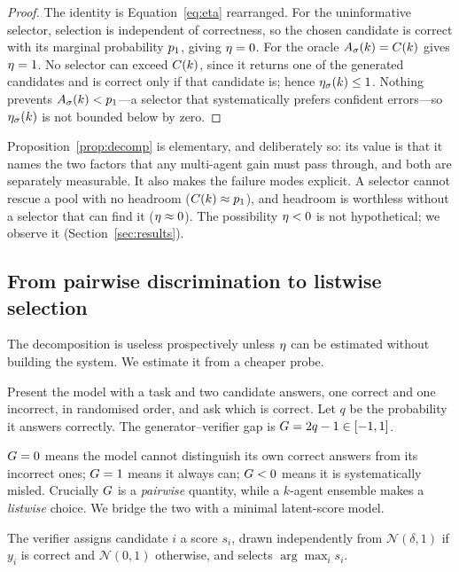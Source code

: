 \begin{proof}
The identity is Equation~\eqref{eq:eta} rearranged. For the uninformative
selector, selection is independent of correctness, so the chosen candidate is
correct with its marginal probability $p_1$, giving $\eta=0$. For the oracle
$A_\sigma(k)=C(k)$ gives $\eta=1$. No selector can exceed $C(k)$, since it
returns one of the generated candidates and is correct only if that candidate
is; hence $\eta_\sigma(k)\le 1$. Nothing prevents $A_\sigma(k) < p_1$---a
selector that systematically prefers confident errors---so $\eta_\sigma(k)$ is
not bounded below by zero.
\end{proof}

Proposition~\ref{prop:decomp} is elementary, and deliberately so: its value is
that it names the two factors that any multi-agent gain must pass through, and
both are separately measurable. It also makes the failure modes explicit.
A selector cannot rescue a pool with no headroom ($C(k) \approx p_1$), and
headroom is worthless without a selector that can find it ($\eta \approx 0$).
The possibility $\eta < 0$ is not hypothetical; we observe it
(Section~\ref{sec:results}).

\subsection{From pairwise discrimination to listwise selection}

The decomposition is useless prospectively unless $\eta$ can be estimated
without building the system. We estimate it from a cheaper probe.

\begin{definition}
Present the model with a task and two candidate answers, one correct and one
incorrect, in randomised order, and ask which is correct. Let $q$ be the
probability it answers correctly. The generator--verifier gap is
$G = 2q - 1 \in [-1, 1]$.
\end{definition}

$G=0$ means the model cannot distinguish its own correct answers from its
incorrect ones; $G=1$ means it always can; $G<0$ means it is
systematically misled. Crucially $G$ is a \emph{pairwise} quantity, while a
$k$-agent ensemble makes a \emph{listwise} choice. We bridge the two with a
minimal latent-score model.

\begin{definition}
\label{def:latent}
The verifier assigns candidate $i$ a score $s_i$, drawn independently from
$\mathcal{N}(\delta,1)$ if $y_i$ is correct and $\mathcal{N}(0,1)$ otherwise,
and selects $\arg\max_i s_i$.
\end{definition}

